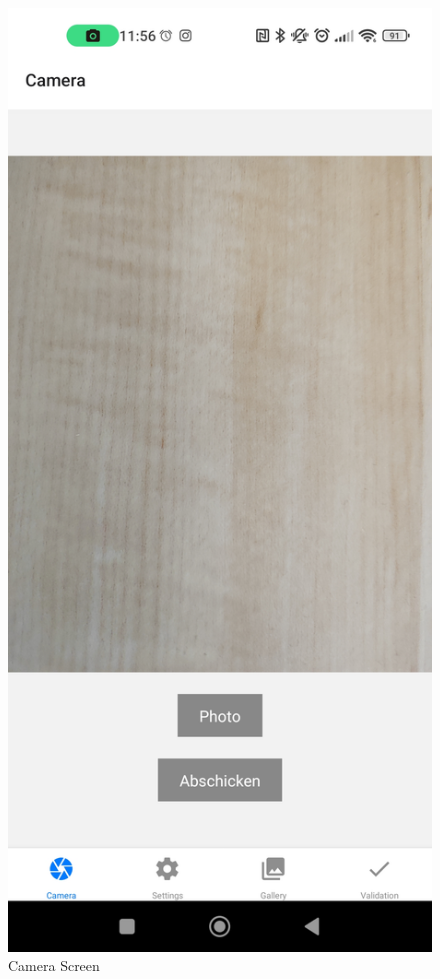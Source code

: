 \begin{figure}
    \centering
    \includegraphics[scale=0.2]{pics/CameraScreen.jpg}
    \caption{Camera Screen}
    \label{fig:impl:camscreen}
\end{figure}

